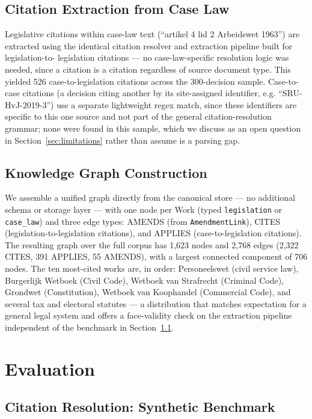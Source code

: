 \documentclass{IOS-Book-Article}
\begin{document}
\subsection{Citation Extraction from Case Law}

Legislative citations within case-law text (``artikel 4 lid 2 Arbeidswet 1963'') are extracted
using the identical citation resolver and extraction pipeline built for legislation-to-
legislation citations --- no case-law-specific resolution logic was needed, since a citation is
a citation regardless of source document type. This yielded 526 case-to-legislation
citations across the 300-decision sample. Case-to-case citations (a decision citing another
by its site-assigned identifier, e.g. ``SRU-HvJ-2019-3'') use a separate lightweight regex
match, since these identifiers are specific to this one source and not part of the general
citation-resolution grammar; none were found in this sample, which we discuss as an open
question in Section~\ref{sec:limitations} rather than assume is a parsing gap.

\subsection{Knowledge Graph Construction}

We assemble a unified graph directly from the canonical store --- no additional schema or
storage layer --- with one node per Work (typed \texttt{legislation} or \texttt{case\_law}) and three edge
types: AMENDS (from \texttt{AmendmentLink}), CITES (legislation-to-legislation citations), and
APPLIES (case-to-legislation citations). The resulting graph over the full corpus has
1,623 nodes and 2,768 edges (2,322 CITES, 391 APPLIES, 55 AMENDS), with a largest connected
component of 706 nodes. The ten most-cited works are, in order: Personeelswet (civil service
law), Burgerlijk Wetboek (Civil Code), Wetboek van Strafrecht (Criminal Code), Grondwet
(Constitution), Wetboek van Koophandel (Commercial Code), and several tax and electoral
statutes --- a distribution that matches expectation for a general legal system and offers a
face-validity check on the extraction pipeline independent of the benchmark in Section~\ref{sec:resolver-eval}.

\section{Evaluation}
\label{sec:eval}

\subsection{Citation Resolution: Synthetic Benchmark}
\label{sec:resolver-eval}
\end{document}
